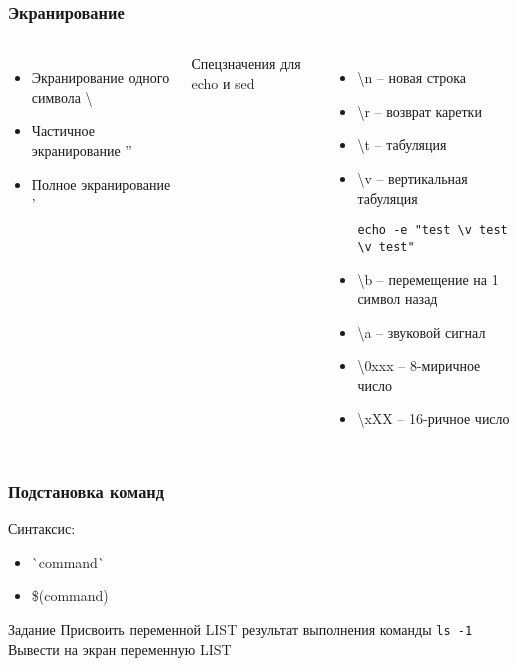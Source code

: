 \begin{frame}[fragile]
	\frametitle{Экранирование}

	\begin{columns}
		\begin{itemize}
			\item Экранирование одного символа \textbackslash 
			\item Частичное экранирование ''
			\item Полное экранирование '
		\end{itemize}
		\pause
		Спецзначения для echo и sed
		\begin{itemize}
			\item \textbackslash{n} -- новая строка
			\item \textbackslash{r} -- возврат каретки
			\item \textbackslash{t} -- табуляция
			\item \textbackslash{v} -- вертикальная табуляция \\
				\small\begin{lstlisting}
echo -e "test \v test \v test"
				\end{lstlisting}
			\item \textbackslash{b} -- перемещение на 1 символ назад
			\item \textbackslash{a} -- звуковой сигнал
			\item \textbackslash{0xxx} -- 8-миричное число
			\item \textbackslash{xXX} -- 16-ричное число
		\end{itemize}
	\end{columns}

\end{frame}


\begin{frame}
	\frametitle{Подстановка команд}
	
	Синтаксис:

	\begin{itemize}
		\item \`{}command\`{}
		\item \$(command)
	\end{itemize}
	\pause
	\begin{block}{Задание}
		Присвоить переменной LIST результат выполнения команды {\tt ls -1} \\
		Вывести на экран переменную LIST
	\end{block}
\end{frame}

